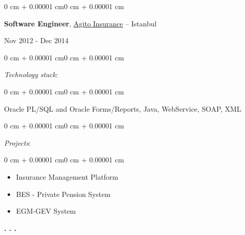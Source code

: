 \documentclass[10pt, letterpaper]{article}
\newenvironment{highlights}{
    \begin{itemize}[
        topsep=0.10 cm,
        parsep=0.10 cm,
        partopsep=0pt,
        itemsep=0pt,
        leftmargin=0 cm + 10pt]
}{
    \end{itemize}} %
\newenvironment{onecolentry}{
    \begin{adjustwidth}{0 cm + 0.00001 cm}{0 cm + 0.00001 cm}
}{
    \end{adjustwidth}}
\newenvironment{twocolentry}[2][]{
    \onecolentry
    \def\secondColumn{#2}
    \setcolumnwidth{\fill, 4.5 cm}
    \begin{paracol}{2}
}{
    \switchcolumn \raggedleft \secondColumn
    \end{paracol}
    \endonecolentry
} %
\begin{document}
        \begin{twocolentry}{Nov 2012 - Dec 2014}
            \textbf{Software Engineer}, \href{https://www.agito.com.tr/}{Agito Insurance} -- Istanbul
        \end{twocolentry}
            \begin{onecolentry}
                \textit{Technology stack}:
            \end{onecolentry}
            \begin{onecolentry}
                \begin{highlights}
                    Oracle PL/SQL and Oracle Forms/Reports, Java, WebService, SOAP, XML
                \end{highlights}
            \end{onecolentry}
            \vspace{0.2 cm}
            \begin{onecolentry}
                \textit{Projects}:
            \end{onecolentry}
            \begin{onecolentry}
                \begin{highlights}
                    \item Insurance Management Platform
                    \item BES - Private Pension System
                    \item EGM-GEV System
                \end{highlights}
            \end{onecolentry}
            \vspace{0.5 cm}

        \begin{center}
            \textbf{. . .}
        \end{center}
\end{document}
